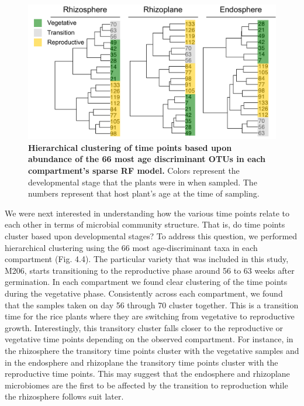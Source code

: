 \begin{figure}[h]
\centering
\includegraphics[width=5in]{Figures/figure3_4}
\caption[Figure 4.4]{\textbf{Hierarchical clustering of time points based upon abundance of the 66 most age discriminant OTUs in each compartment's sparse RF model.} Colors represent the developmental stage that the plants were in when sampled. The numbers represent that host plant's age at the time of sampling.}
\label{Figure 4.4}
\end{figure}

We were next interested in understanding how the various time points relate to each other in terms of microbial community structure. That is, do time points cluster based upon developmental stages? To address this question, we performed hierarchical clustering using the 66 most age-discriminant taxa in each compartment (Fig. 4.4). The particular variety that was included in this study, M206, starts transitioning to the reproductive phase around 56 to 63 weeks after germination. In each compartment we found clear clustering of the time points during the vegetative phase. Consistently across each compartment, we found that the samples taken on day 56 through 70 cluster together. This is a transition time for the rice plants where they are switching from vegetative to reproductive growth. Interestingly, this transitory cluster falls closer to the reproductive or vegetative time points depending on the observed compartment. For instance, in the rhizosphere the transitory time points cluster with the vegetative samples and in the endosphere and rhizoplane the transitory time points cluster with the reproductive time points. This may suggest that the endosphere and rhizoplane microbiomes are the first to be affected by the transition to reproduction while the rhizosphere follows suit later.	

